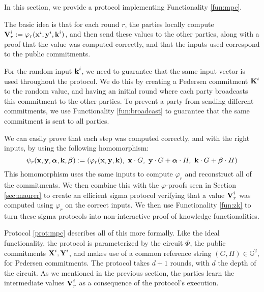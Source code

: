 In this section, we provide a protocol implementing Functionality
\ref{fun:mpc}.

The basic idea is that for each round $r$, the parties locally
compute $\textbf{V}^i_r := \varphi_r(\textbf{x}^i, \textbf{y}^i, \textbf{k}^i)$, and then
send these values to the other parties, along with a proof that
the value was computed correctly, and that the inputs used correspond
to the public commitments.

For the random input $\textbf{k}^i$, we need to guarantee that the same
input vector is used throughout the protocol.
We do this by creating a Pedersen commitment $\textbf{K}^i$ to the random value,
and having an initial round where each party broadcasts this commitment
to the other parties.
To prevent a party from sending different commitments, we
use Functionality \ref{fun:broadcast} to guarantee that the same
commitment is sent to all parties.

We can easily prove that each step was computed correctly, and with the right
inputs, by using the following homomorphism:
$$
\psi_r(\textbf{x}, \textbf{y}, \boldsymbol{\alpha}, \textbf{k}, \boldsymbol{\beta})
:= (\varphi_r(\textbf{x}, \textbf{y}, \textbf{k}),\ \textbf{x} \cdot G,\ \textbf{y} \cdot G + \boldsymbol{\alpha} \cdot H,\
\textbf{k} \cdot G + \boldsymbol{\beta} \cdot H) 
$$
This homomorphism uses the same inputs to compute $\varphi_r$
and reconstruct all of the commitments.
We then combine this with the $\varphi$-proofs seen in Section \ref{sec:maurer} to
create an efficient sigma protocol verifying
that a value $\textbf{V}^i_r$ was computed using $\varphi_r$ on the correct
inputs.
We then use Functionality \ref{fun:zk} to turn these sigma protocols
into non-interactive proof of knowledge functionalities.

Protocol \ref{prot:mpc} describes all of this more formally.
Like the ideal functionality, the protocol is parameterized by
the circuit $\Phi$, the public commitments $\textbf{X}^i, \textbf{Y}^i$, and makes
use of a common reference string $(G, H) \in \mathbb{G}^2$, for Pedersen
commitments.
The protocol takes $d + 1$ rounds, with $d$ the depth of the circuit.
As we mentioned in the previous section, the parties learn
the intermediate values $\textbf{V}^i_r$ as a consequence of the protocol's
execution.

